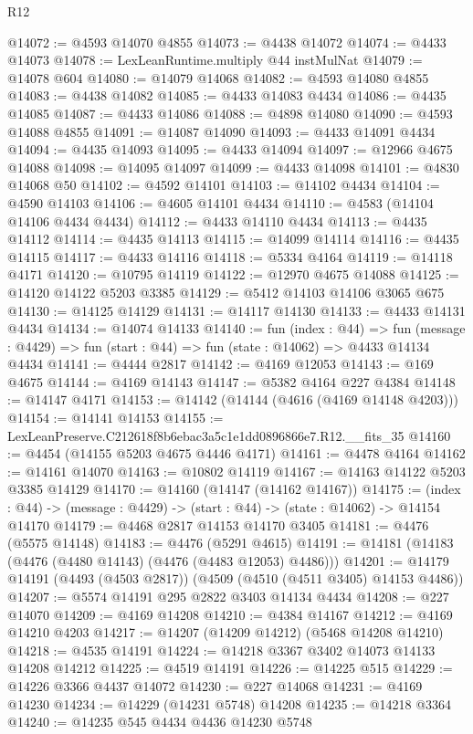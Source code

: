 \begin{lexlean}{R12}
\begin{coremodule}
@14072 := @4593 @14070 @4855
@14073 := @4438 @14072
@14074 := @4433 @14073
@14078 := LexLeanRuntime.multiply @44 instMulNat
@14079 := @14078 @604
@14080 := @14079 @14068
@14082 := @4593 @14080 @4855
@14083 := @4438 @14082
@14085 := @4433 @14083 @4434
@14086 := @4435 @14085
@14087 := @4433 @14086
@14088 := @4898 @14080
@14090 := @4593 @14088 @4855
@14091 := @14087 @14090
@14093 := @4433 @14091 @4434
@14094 := @4435 @14093
@14095 := @4433 @14094
@14097 := @12966 @4675 @14088
@14098 := @14095 @14097
@14099 := @4433 @14098
@14101 := @4830 @14068 @50
@14102 := @4592 @14101
@14103 := @14102 @4434
@14104 := @4590 @14103
@14106 := @4605 @14101 @4434
@14110 := @4583 (@14104 @14106 @4434 @4434)
@14112 := @4433 @14110 @4434
@14113 := @4435 @14112
@14114 := @4435 @14113
@14115 := @14099 @14114
@14116 := @4435 @14115
@14117 := @4433 @14116
@14118 := @5334 @4164
@14119 := @14118 @4171
@14120 := @10795 @14119
@14122 := @12970 @4675 @14088
@14125 := @14120 @14122 @5203 @3385
@14129 := @5412 @14103 @14106 @3065 @675
@14130 := @14125 @14129
@14131 := @14117 @14130
@14133 := @4433 @14131 @4434
@14134 := @14074 @14133
@14140 := fun (index : @44) =>
  fun (message : @4429) => fun (start : @44) => fun (state : @14062) => @4433 @14134 @4434
@14141 := @4444 @2817
@14142 := @4169 @12053
@14143 := @169 @4675
@14144 := @4169 @14143
@14147 := @5382 @4164 @227 @4384
@14148 := @14147 @4171
@14153 := @14142 (@14144 (@4616 (@4169 @14148 @4203)))
@14154 := @14141 @14153
@14155 := LexLeanPreserve.C212618f8b6ebac3a5c1e1dd0896866e7.R12.__fits_35
@14160 := @4454 (@14155 @5203 @4675 @4446 @4171)
@14161 := @4478 @4164
@14162 := @14161 @14070
@14163 := @10802 @14119
@14167 := @14163 @14122 @5203 @3385 @14129
@14170 := @14160 (@14147 (@14162 @14167))
@14175 := (index : @44) -> (message : @4429) -> (start : @44) -> (state : @14062) -> @14154 @14170
@14179 := @4468 @2817 @14153 @14170 @3405
@14181 := @4476 (@5575 @14148)
@14183 := @4476 (@5291 @4615)
@14191 := @14181 (@14183 (@4476 (@4480 @14143) (@4476 (@4483 @12053) @4486)))
@14201 := @14179 @14191 (@4493 (@4503 @2817)) (@4509 (@4510 (@4511 @3405) @14153 @4486))
@14207 := @5574 @14191 @295 @2822 @3403 @14134 @4434
@14208 := @227 @14070
@14209 := @4169 @14208
@14210 := @4384 @14167
@14212 := @4169 @14210 @4203
@14217 := @14207 (@14209 @14212) (@5468 @14208 @14210)
@14218 := @4535 @14191
@14224 := @14218 @3367 @3402 @14073 @14133 @14208 @14212
@14225 := @4519 @14191
@14226 := @14225 @515
@14229 := @14226 @3366 @4437 @14072
@14230 := @227 @14068
@14231 := @4169 @14230
@14234 := @14229 (@14231 @5748) @14208
@14235 := @14218 @3364
@14240 := @14235 @545 @4434 @4436 @14230 @5748

\end{coremodule}
\end{lexlean}
